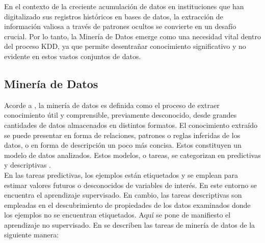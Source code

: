 En el contexto de la creciente acumulación de datos en instituciones que han digitalizado sus registros históricos en bases de datos, la extracción de información valiosa a través de patrones ocultos se convierte en un desafío crucial. Por lo tanto, la Minería de Datos emerge como una necesidad vital dentro del proceso KDD, ya que permite desentrañar conocimiento significativo y no evidente en estos vastos conjuntos de datos.

\subsection{Minería de Datos}
Acorde a \citep{orallo2004}, la minería de datos es definida como el proceso de extraer conocimiento útil y comprensible, previamente desconocido, desde grandes cantidades de datos almacenados en distintos formatos. El conocimiento extraído se puede presentar en forma de relaciones, patrones o reglas inferidas de los datos, o en forma de descripción un poco más concisa. Estos constituyen un modelo de datos analizados. Estos modelos, o tareas, se categorizan en predictivas y descriptivas \citep{orallo2004}. \\
En las tareas predictivas, los ejemplos están etiquetados y se emplean para estimar valores futuros o desconocidos de variables de interés. En este entorno se encuentra el aprendizaje supervisado. En cambio, las tareas descriptivas son empleadas en el descubrimiento de propiedades de los datos examinados donde los ejemplos no se encuentran etiquetados. Aquí se pone de manifiesto el aprendizaje no supervisado. En \citep{orallo2004} se describen las tareas de minería de datos de la siguiente manera:
